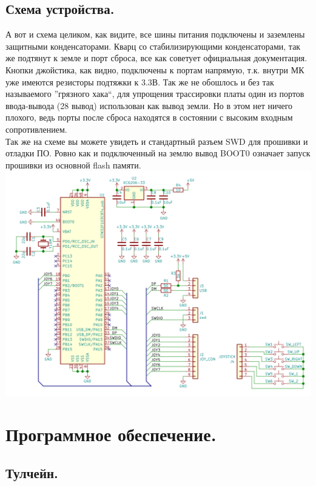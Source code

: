 \documentclass[12pt,a4paper]{article}
\begin{document}
\subsection{Схема устройства.}
    А вот и схема целиком, как видите, все шины питания подключены и
    заземлены защитными конденсаторами. Кварц со стабилизирующими конденсаторами,
    так же подтянут к земле и порт сброса, все как советует официальная документация.
    Кнопки джойстика, как видно, подключены к портам напрямую, т.к. внутри МК
    уже имеются резисторы подтяжки к 3.3В. Так же не обошлось и без так
    называемого ''грязного хака``, для упрощения трассировки платы один из
    портов ввода-вывода (28 вывод) использован как вывод земли. Но в этом нет ничего плохого,
    ведь порты после сброса находятся в состоянии с высоким входным
    сопротивлением.\\
    Так же на схеме вы можете увидеть и стандартный разъем SWD для прошивки
    и отладки ПО. Ровно как и подключенный на землю вывод BOOT0 означает
    запуск прошивки из основной flash памяти. \\
\includegraphics[width=15cm]{sch.png}\\


\section{Программное обеспечение.}

\subsection{Тулчейн.}
\end{document}
